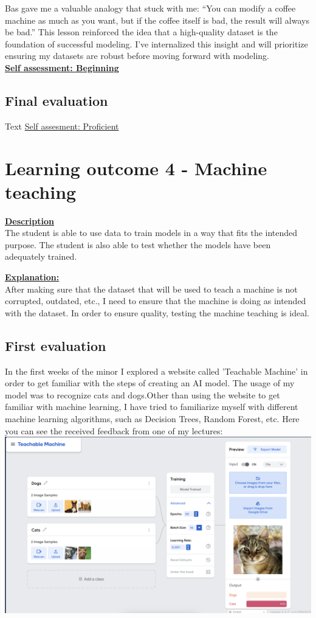 \documentclass{article}
\begin{document}
	Bas gave me a valuable analogy that stuck with me: “You can modify a coffee machine as much as you want, but if the coffee itself is bad, the result will always be bad.” This lesson reinforced the idea that a high-quality dataset is the foundation of successful modeling. I’ve internalized this insight and will prioritize ensuring my datasets are robust before moving forward with modeling.\\
	  \underline{\textbf{Self assessment: Beginning}}
	\subsection{Final evaluation}
	Text
	\underline{Self assesment: Proficient}
	
	\section{Learning outcome 4 - Machine teaching}
	\underline{\textbf{Description}}\\
	The student is able to use data to train models in a way that fits the intended purpose.
	The student is also able to test whether the models have been adequately trained.
	
	\underline{\textbf{Explanation:}}\\
	After making sure that the dataset that will be used to teach a machine is not corrupted, outdated, etc., 
	I need to ensure that the machine is doing as intended with the dataset. In order to ensure quality, testing the
	machine teaching is ideal.
	
	\subsection{First evaluation}
	In the first weeks of the minor I explored a website called 'Teachable Machine' in order to get familiar with the steps of creating an 
	AI model. The usage of my model was to recognize cats and dogs.Other than using the website to get familiar with machine learning, 
  I have tried to familiarize myself with different machine learning algorithms, such as Decision Trees, Random Forest, etc. Here you can see the received feedback from one
  of my lectures:\\
  \includegraphics[width=\textwidth,keepaspectratio]{images/FeedbackTeachableMachines.png}
\end{document}
